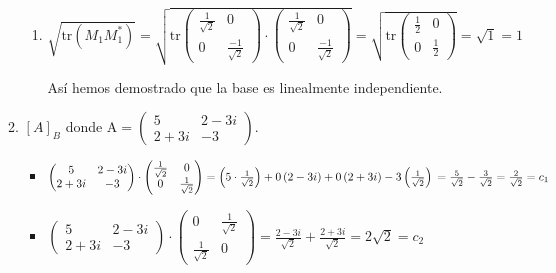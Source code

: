 \documentclass{report}
\begin{document}
\begin{enumerate}
\begin{enumerate}[label=\alph*)]
\begin{enumerate}
    \item $ \sqrt{\text{tr}(M_1 M_1^*)} =\sqrt{\text{tr} \begin{pmatrix}
    \frac{1}{\sqrt{2}}& 0\\
    0 & \frac{-1}{\sqrt{2}}
    \end{pmatrix} \cdot \begin{pmatrix}
    \frac{1}{\sqrt{2}} & 0\\
    0 & \frac{-1}{\sqrt{2}}
    \end{pmatrix}}= \sqrt{\text{tr} \begin{pmatrix}
    \frac{1}{2} & 0 \\
    0 & \frac{1}{2}
    \end{pmatrix}} = \sqrt{1} = 1$
    
    Así hemos demostrado que la base es linealmente independiente.
    
    \end{enumerate}
    
    \newpage
    \item $[A]_B$ donde A$=\begin{pmatrix}
        5 &2-3i\\
        2+3i & -3
    \end{pmatrix}$.
    \begin{itemize}
        \item $\begin{pmatrix}
        5 &2-3i\\
        2+3i & -3
    \end{pmatrix}\cdot\begin{pmatrix}
        \frac{1}{\sqrt{2}}& 0 \\
        0 & \frac{1}{\sqrt{2}}
    \end{pmatrix}= \left( 5\cdot\frac{1}{\sqrt{2}}\right) + 0 \left(2-3i\right) + 0\left(2+3i\right) - 3\left(\frac{1}{\sqrt{2}}\right)
    \\=\frac{5}{\sqrt{2}}-\frac{3}{\sqrt{2}}=\frac{2}{\sqrt{2}}=c_1$
    
    \item $\begin{pmatrix}
        5 &2-3i\\
        2+3i & -3
    \end{pmatrix}\cdot\begin{pmatrix}
       0& \frac{1}{\sqrt{2}} \\
        \frac{1}{\sqrt{2}} & 0
    \end{pmatrix}= \frac{2-3i}{\sqrt{2}}+\frac{2+3i}{\sqrt{2}}=2\sqrt{2}=c_2$
    

\end{itemize}
\end{enumerate}
\end{enumerate}
\end{document}
